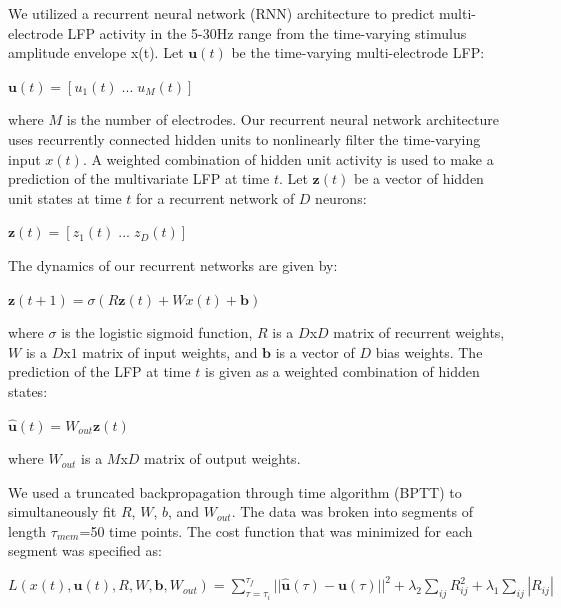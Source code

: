 We utilized a recurrent neural network (RNN) architecture to predict multi-electrode LFP activity in the 5-30Hz range from the time-varying stimulus amplitude envelope x(t). Let $\textbf{u}(t)$ be the time-varying multi-electrode LFP:

\begin{center}
$\textbf{u}(t) = [u_1 (t) \; ... \; u_M (t)]$
\end{center}

where $M$ is the number of electrodes. Our recurrent neural network architecture uses recurrently connected hidden units to nonlinearly filter the time-varying input $x(t)$. A weighted combination of hidden unit activity is used to make a prediction of the multivariate LFP at time $t$. Let $\textbf{z}(t)$ be a vector of hidden unit states at time $t$ for a recurrent network of $D$ neurons:

\begin{center}
$\textbf{z}(t) = [z_1 (t) \; ... \; z_D (t)]$
\end{center}

The dynamics of our recurrent networks are given by:

\begin{center}
$ \textbf{z}(t+1) = \sigma \left( R \textbf{z}(t)  + W x(t) + \textbf{b} \right)$
\end{center}

where $\sigma$ is the logistic sigmoid function, $R$ is a $D$x$D$ matrix of recurrent weights, $W$ is a $D$x$1$ matrix of input weights, and $\textbf{b}$ is a vector of $D$ bias weights. The prediction of the LFP at time $t$ is given as a weighted combination of hidden states:

\begin{center}
$\hat{\textbf{u}}(t) = W_{out} \textbf{z}(t)$
\end{center}

where $W_{out}$ is a $M$x$D$ matrix of output weights.

    We used a truncated backpropagation through time algorithm (BPTT) \cite{Werbos1990} to simultaneously fit $R$, $W$, $b$, and $W_{out}$. The data was broken into segments of length $\tau_{mem}$=50 time points. The cost function that was minimized for each segment was specified as:

\begin{center}
$L(x(t), \textbf{u}(t), R, W, \textbf{b}, W_{out}) = \sum _{\tau = \tau_i} ^{\tau_f} || \hat{\textbf{u}}(\tau) - \textbf{u}(\tau) ||^2 + \lambda_2 \sum _{ij} R_{ij}^2 + \lambda_1 \sum_{ij} |R_{ij}|$
\end{center}

